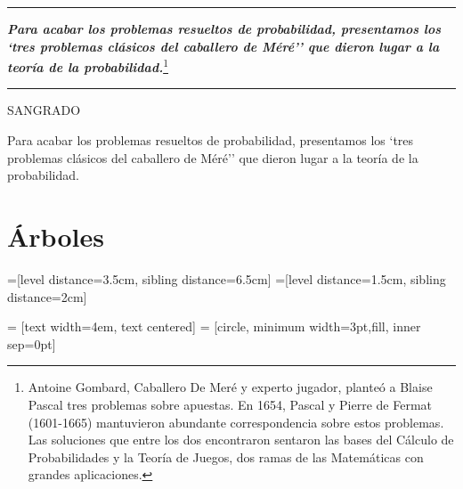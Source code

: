\vspace{1cm}
\begin{adjustwidth}{50pt}{50pt}
	\textcolor{gris}{\rule{70mm}{0.1mm}}
	\begin{destacado}
	\textbf{\emph{Para acabar los problemas resueltos de probabilidad, presentamos los `tres problemas clásicos del caballero de Méré'' que dieron lugar a la teoría de la probabilidad.}}\footnote{Antoine Gombard, Caballero De Meré y experto jugador, planteó a  Blaise Pascal tres problemas sobre apuestas. En 1654, Pascal y Pierre de Fermat (1601-1665) mantuvieron abundante correspondencia sobre estos problemas. Las soluciones que entre los dos encontraron sentaron las bases del Cálculo de Probabilidades y la Teoría de Juegos, dos ramas de las Matemáticas con grandes aplicaciones.}
	\end{destacado}
	\begin{flushright}
	\rule{70mm}{0.1mm}	
	\end{flushright}
\end{adjustwidth}
\vspace{1cm}



\begin{adjustwidth}{75pt}{75pt}
	
SANGRADO

Para acabar los problemas resueltos de probabilidad, presentamos los `tres problemas clásicos del caballero de Méré'' que dieron lugar a la teoría de la probabilidad.	
\end{adjustwidth}

\section{Árboles}


=[level distance=3.5cm, sibling distance=6.5cm]
=[level distance=1.5cm, sibling distance=2cm]

 = [text width=4em, text centered]
 = [circle, minimum width=3pt,fill, inner sep=0pt]

